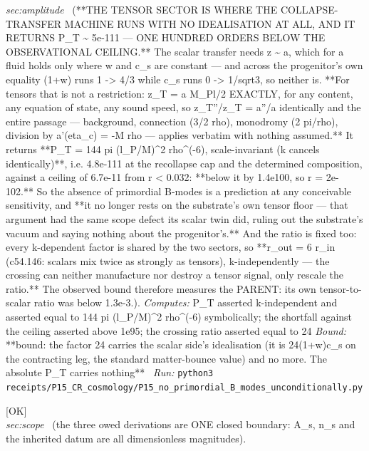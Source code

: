 \begin{description}
\textit{sec:amplitude} \ (**THE TENSOR SECTOR IS WHERE THE COLLAPSE-TRANSFER MACHINE RUNS WITH NO IDEALISATION AT ALL, AND IT RETURNS P\_T \textasciitilde{} 5e-111 --- ONE HUNDRED ORDERS BELOW THE OBSERVATIONAL CEILING.** The scalar transfer needs z \textasciitilde{} a, which for a fluid holds only where w and c\_s are constant --- and across the progenitor's own equality (1+w) runs 1 -> 4/3 while c\_s runs 0 -> 1/sqrt3, so neither is. **For tensors that is not a restriction: z\_T = a M\_Pl/2 EXACTLY, for any content, any equation of state, any sound speed, so z\_T''/z\_T = a''/a identically and the entire passage --- background, connection (3/2 rho), monodromy (2 pi/rho), division by a'(eta\_c) = -M rho --- applies verbatim with nothing assumed.** It returns **P\_T = 144 pi (l\_P/M)\textasciicircum{}2 rho\textasciicircum{}(-6), scale-invariant (k cancels identically)**, i.e. 4.8e-111 at the recollapse cap and the determined composition, against a ceiling of 6.7e-11 from r < 0.032: **below it by 1.4e100, so r = 2e-102.** So the absence of primordial B-modes is a prediction at any conceivable sensitivity, and **it no longer rests on the substrate's own tensor floor --- that argument had the same scope defect its scalar twin did, ruling out the substrate's vacuum and saying nothing about the progenitor's.** And the ratio is fixed too: every k-dependent factor is shared by the two sectors, so **r\_out = 6 r\_in (c54.146: scalars mix twice as strongly as tensors), k-independently --- the crossing can neither manufacture nor destroy a tensor signal, only rescale the ratio.** The observed bound therefore measures the PARENT: its own tensor-to-scalar ratio was below 1.3e-3.). 
\emph{Computes:} P\_T asserted k-independent and asserted equal to 144 pi (l\_P/M)\textasciicircum{}2 rho\textasciicircum{}(-6) symbolically; the shortfall against the ceiling asserted above 1e95; the crossing ratio asserted equal to 24
 \emph{Bound:} **bound: the factor 24 carries the scalar side's idealisation (it is 24(1+w)c\_s on the contracting leg, the standard matter-bounce value) and no more. The absolute P\_T carries nothing**
\ \emph{Run:} \texttt{python3 receipts/P15\_CR\_cosmology/P15\_no\_primordial\_B\_modes\_unconditionally.py}
\item[\label{rcpt:A2_the_three_owed_derivations_are_one_boundary}\textbf{}\quad\texttt{A2\_the\_three\_owed\_derivations\_are\_one\_boundary}]\hfill\textsf{[OK]}\\
\textit{sec:scope} \ (the three owed derivations are ONE closed boundary: A\_s, n\_s and the inherited datum are all dimensionless magnitudes). 

\end{description}
